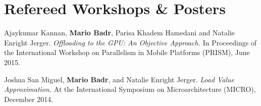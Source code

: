 \section{\sc Refereed Workshops \& Posters}

{
  Ajaykumar Kannan, \textbf{Mario Badr}, Parisa Khadem Hamedani and Natalie Enright Jerger.
  \textit{Offloading to the GPU: An Objective Approach.}
  In Proceedings of the International Workshop on Parallelism in Mobile Platforms (PRISM), June 2015.
}

{
  Joshua San Miguel, \textbf{Mario Badr}, and Natalie Enright Jerger.
  \textit{Load Value Approximation.}
  At the International Symposium on Microarchitecture (MICRO), December 2014.
}
